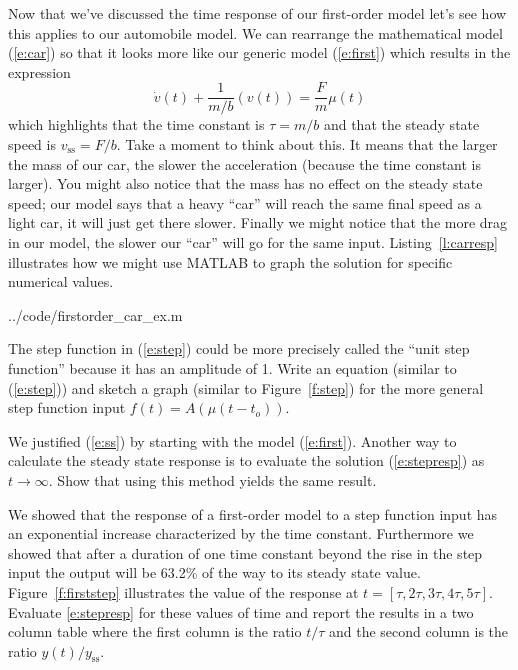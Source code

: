 Now that we've discussed the time response of our first-order model let's see how this applies to our automobile model.  We can rearrange the mathematical model (\ref{e:car}) so that it looks more like our generic model (\ref{e:first}) which results in the expression
\begin{equation}\label{e:car2}
\dot{v}(t) + \frac{1}{m/b}(v(t)) = \frac{F}{m}\mu(t)
\end{equation}
which highlights that the time constant is $\tau=m/b$ and that the steady state speed is $v_{\mathrm{ss}}=F/b$.  Take a moment to think about this.  It means that the larger the mass of our car, the slower the acceleration (because the time constant is larger).  You might also notice that the mass has no effect on the steady state speed; our model says that a heavy ``car'' will reach the same final speed as a light car, it will just get there slower.  Finally we might notice that the more drag in our model, the slower our ``car'' will go for the same input. Listing~\ref{l:carresp} illustrates how we might use MATLAB to graph the solution for specific numerical values.


{../code/firstorder_car_ex.m}

\begin{ex}
The step function in (\ref{e:step}) could be more precisely called the ``unit step function'' because it has an amplitude of 1.  Write an equation (similar to (\ref{e:step})) and sketch a graph (similar to Figure~\ref{f:step}) for the more general step function input $f(t) = A(\mu(t-t_o))$.
\end{ex}

\begin{ex}
We justified (\ref{e:ss}) by starting with the model (\ref{e:first}).  Another way to calculate the steady state response is to evaluate the solution (\ref{e:stepresp}) as $t \to \infty$.  Show that using this method yields the same result.
\end{ex}

\begin{ex}
We showed that the response of a first-order model to a step function input has an exponential increase characterized by the time constant.  Furthermore we showed that after a duration of one time constant beyond the rise in the step input the output will be 63.2\% of the way to its steady state value.  Figure~\ref{f:firststep} illustrates the value of the response at  $t=[\tau,2\tau,3\tau,4\tau,5\tau]$.  Evaluate \ref{e:stepresp} for these values of time and report the results in a two column table where the first column is the ratio $t/\tau$ and the second column is the ratio $y(t)/y_{\mathrm{ss}}$.
\end{ex}

